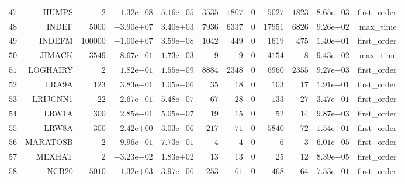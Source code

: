 \begin{longtable}{rrrrrrrrrrrr}
  \(    47\) & HUMPS & \(     2\) & \( 1.32\)e\(-08\) & \( 5.16\)e\(-05\) & \(  3535\) & \(  1807\) & \(     0\) & \(  5027\) & \(  1823\) & \( 8.65\)e\(-03\) & first\_order \\
  \(    48\) & INDEF & \(  5000\) & \(-3.90\)e\(+07\) & \( 3.40\)e\(+03\) & \(  7936\) & \(  6337\) & \(     0\) & \( 17951\) & \(  6826\) & \( 9.26\)e\(+02\) & max\_time \\
  \(    49\) & INDEFM & \(100000\) & \(-1.00\)e\(+07\) & \( 3.59\)e\(-08\) & \(  1042\) & \(   449\) & \(     0\) & \(  1619\) & \(   475\) & \( 1.40\)e\(+01\) & first\_order \\
  \(    50\) & JIMACK & \(  3549\) & \( 8.67\)e\(-01\) & \( 1.73\)e\(-03\) & \(     9\) & \(     9\) & \(     0\) & \(  4154\) & \(     8\) & \( 9.43\)e\(+02\) & max\_time \\
  \(    51\) & LOGHAIRY & \(     2\) & \( 1.82\)e\(-01\) & \( 1.55\)e\(-09\) & \(  8884\) & \(  2348\) & \(     0\) & \(  6960\) & \(  2355\) & \( 9.27\)e\(-03\) & first\_order \\
  \(    52\) & LRA9A & \(   123\) & \( 3.83\)e\(-01\) & \( 1.05\)e\(-06\) & \(    35\) & \(    18\) & \(     0\) & \(   103\) & \(    17\) & \( 1.91\)e\(-01\) & first\_order \\
  \(    53\) & LRIJCNN1 & \(    22\) & \( 2.67\)e\(-01\) & \( 5.48\)e\(-07\) & \(    67\) & \(    28\) & \(     0\) & \(   133\) & \(    27\) & \( 3.47\)e\(-01\) & first\_order \\
  \(    54\) & LRW1A & \(   300\) & \( 2.85\)e\(-01\) & \( 5.05\)e\(-07\) & \(    19\) & \(    15\) & \(     0\) & \(    52\) & \(    14\) & \( 9.87\)e\(-03\) & first\_order \\
  \(    55\) & LRW8A & \(   300\) & \( 2.42\)e\(+00\) & \( 3.03\)e\(-06\) & \(   217\) & \(    71\) & \(     0\) & \(  5840\) & \(    72\) & \( 1.54\)e\(+01\) & first\_order \\
  \(    56\) & MARATOSB & \(     2\) & \( 9.96\)e\(-01\) & \( 7.73\)e\(-01\) & \(     4\) & \(     4\) & \(     0\) & \(     6\) & \(     3\) & \( 6.01\)e\(-05\) & first\_order \\
  \(    57\) & MEXHAT & \(     2\) & \(-3.23\)e\(-02\) & \( 1.83\)e\(+02\) & \(    13\) & \(    13\) & \(     0\) & \(    25\) & \(    12\) & \( 8.39\)e\(-05\) & first\_order \\
  \(    58\) & NCB20 & \(  5010\) & \(-1.32\)e\(+03\) & \( 3.97\)e\(-06\) & \(   253\) & \(    61\) & \(     0\) & \(   468\) & \(    64\) & \( 7.53\)e\(-01\) & first\_order \\

\end{longtable}
